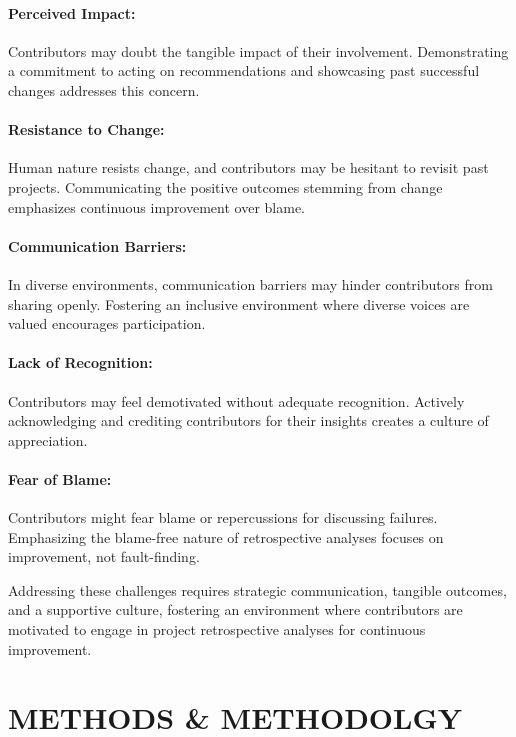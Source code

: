 \documentclass{article}
\begin{document}
\paragraph*{Perceived Impact:} Contributors may doubt the tangible impact of their involvement. Demonstrating a commitment to acting on recommendations and showcasing past successful changes addresses this concern.

\paragraph*{Resistance to Change:} Human nature resists change, and contributors may be hesitant to revisit past projects. Communicating the positive outcomes stemming from change emphasizes continuous improvement over blame.

\paragraph*{Communication Barriers:} In diverse environments, communication barriers may hinder contributors from sharing openly. Fostering an inclusive environment where diverse voices are valued encourages participation.

\paragraph*{Lack of Recognition:} Contributors may feel demotivated without adequate recognition. Actively acknowledging and crediting contributors for their insights creates a culture of appreciation.

\paragraph*{Fear of Blame:} Contributors might fear blame or repercussions for discussing failures. Emphasizing the blame-free nature of retrospective analyses focuses on improvement, not fault-finding.

\noindent Addressing these challenges requires strategic communication, tangible outcomes, and a supportive culture, fostering an environment where contributors are motivated to engage in project retrospective analyses for continuous improvement.

\newpage
\section{METHODS \& METHODOLGY}
\end{document}
